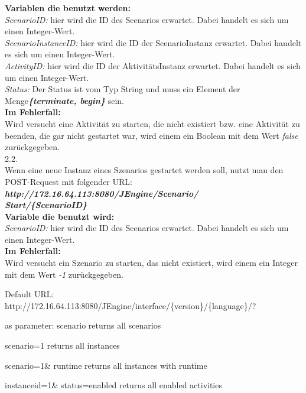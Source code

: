 \documentclass{article}
\begin{document}
\begin{enumerate}
\textbf{Variablen die benutzt werden:}\\
\textit{ScenarioID:} hier wird die ID des Scenarios erwartet. Dabei handelt es sich um einen Integer-Wert.\\
\textit{ScenarioInstanceID:} hier wird die ID der ScenarioInstanz erwartet. Dabei handelt es sich um einen Integer-Wert.\\
\textit{ActivityID:} hier wird die ID der AktivitätsInstanz erwartet. Dabei handelt es sich um einen Integer-Wert.\\
\textit{Status:} Der Status ist vom Typ String und muss ein Element der Menge\textbf{\textit{\{terminate, begin\}}} sein.\\

\textbf{Im Fehlerfall:}\\
Wird versucht eine Aktivität zu starten, die nicht existiert bzw. eine Aktivität zu beenden, die gar nicht gestartet war, wird einem ein Boolean mit dem Wert \textit{false} zurückgegeben.\\

2.2.\\ Wenn eine neue Instanz eines Szenarios gestartet werden soll, nutzt man den POST-Request mit folgender URL:\\
\textit{\textbf{http://172.16.64.113:8080/JEngine/Scenario/\\Start/\{ScenarioID\}}}\\

\textbf{Variable die benutzt wird:}\\
\textit{ScenarioID:} hier wird die ID des Scenarios erwartet. Dabei handelt es sich um einen Integer-Wert.\\

\textbf{Im Fehlerfall:}\\
Wird versucht ein Szenario zu starten, das nicht existiert, wird einem ein Integer mit dem Wert \textit{-1} zurückgegeben.\\

\end{enumerate}


Default URL:
http://172.16.64.113:8080/JEngine/interface/\{version\}/\{language\}/?

as parameter:
scenario
returns all scenarios
 
scenario=1
returns all instances

scenario=1\& runtime
returns all instances with runtime

instanceid=1\& status=enabled
returns all enabled activities
\end{document}
